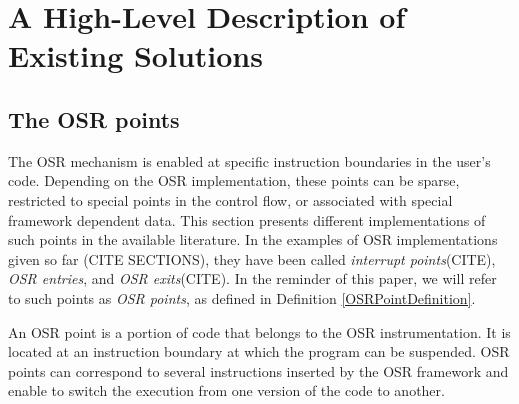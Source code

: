 \section{A High-Level Description of Existing Solutions}
\subsection{The OSR points}
The OSR mechanism is enabled at specific instruction boundaries in the user's code.
Depending on the OSR implementation, these points can be sparse, restricted to special points in the control flow, or associated with special framework dependent data.
This section presents different implementations of such points in the available literature.
In the examples of OSR implementations given so far (CITE SECTIONS), they have been called \textit{interrupt points}(CITE), \textit{OSR entries}, and \textit{OSR exits}(CITE).
In the reminder of this paper, we will refer to such points as \textit{OSR points}, as defined in Definition \ref{OSRPointDefinition}.

\begin{definition}\label{OSRPointDefinition}
An OSR point is a portion of code that belongs to the OSR instrumentation.
It is located at an instruction boundary at which the program can be suspended.
OSR points can correspond to several instructions inserted by the OSR framework and enable to switch the execution from one version of the code to another.
\end{definition}

